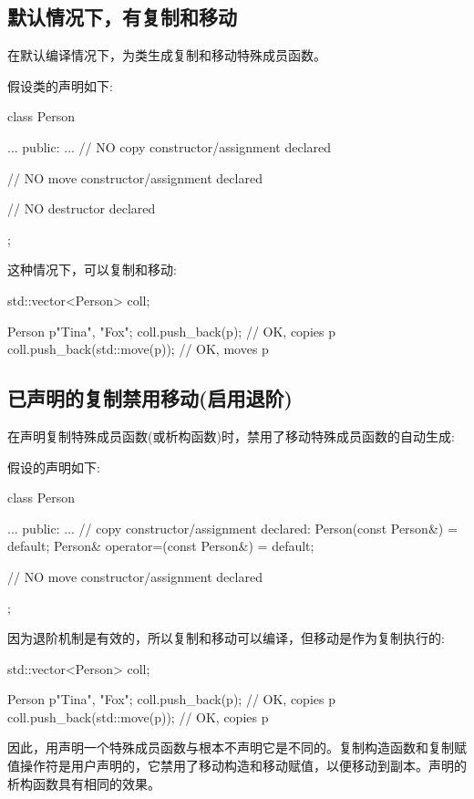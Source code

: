 \subsection{默认情况下，有复制和移动}

在默认编译情况下，为类生成复制和移动特殊成员函数。

假设类的声明如下:

\begin{cppcode}
class Person {
	...
public:
	...
	// NO copy constructor/assignment declared

	// NO move constructor/assignment declared

	// NO destructor declared
};
\end{cppcode}

这种情况下，可以复制和移动:

\begin{cppcode}
std::vector<Person> coll;

Person p{"Tina", "Fox"};
coll.push_back(p); // OK, copies p
coll.push_back(std::move(p)); // OK, moves p
\end{cppcode}

\subsection{已声明的复制禁用移动(启用退阶)}

在声明复制特殊成员函数(或析构函数)时，禁用了移动特殊成员函数的自动生成:

假设的声明如下:

\begin{cppcode}
class Person {
	...
public:
	...
	// copy constructor/assignment declared:
	Person(const Person&) = default;
	Person& operator=(const Person&) = default;

	// NO move constructor/assignment declared
};
\end{cppcode}

因为退阶机制是有效的，所以复制和移动可以编译，但移动是作为复制执行的:

\begin{cppcode}
std::vector<Person> coll;

Person p{"Tina", "Fox"};
coll.push_back(p); // OK, copies p
coll.push_back(std::move(p)); // OK, copies p
\end{cppcode}

因此，用声明一个特殊成员函数与根本不声明它是不同的。复制构造函数和复制赋值操作符是用户声明的，它禁用了移动构造和移动赋值，以便移动到副本。声明的析构函数具有相同的效果。

